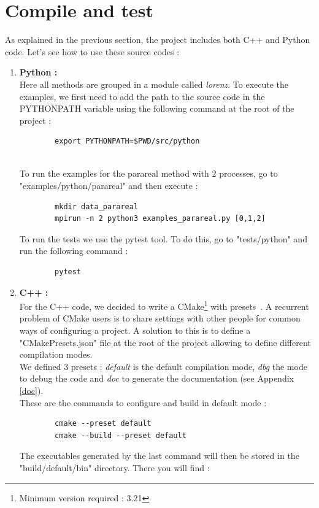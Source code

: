 \newpage

\section{Compile and test}
\label{compile}

	As explained in the previous section, the project includes both C++ and Python code. Let's see how to use these source codes :
	\begin{enumerate}[label=\textbullet]
		\item \textbf{Python :} \\
		Here all methods are grouped in a module called \textit{lorenz}. To execute the examples, we first need to add the path to the source code in the PYTHONPATH variable using the following command at the root of the project :
\begin{lstlisting}
		export PYTHONPATH=$PWD/src/python
\end{lstlisting}
		 \\
		To run the examples for the parareal method with 2 processes, go to "examples/python/parareal" and then execute :
\begin{lstlisting}
		mkdir data_parareal
		mpirun -n 2 python3 examples_parareal.py [0,1,2]
\end{lstlisting}
		To run the tests we use the pytest tool. To do this, go to "tests/python" and run the following command :
\begin{lstlisting}
		pytest
\end{lstlisting}
		\item \textbf{C++ :} \\
		For the C++ code, we decided to write a CMake\footnote[1]{Minimum version required : 3.21} with presets~\cite{cmake_preset}.  A recurrent problem of CMake users is to share settings with other people for common ways of configuring a project. A solution to this is to define a "CMakePresets.json" file at the root of the project allowing to define different compilation modes. \\
		We defined 3 presets : \textit{default} is the default compilation mode, \textit{dbg} the mode to debug the code and \textit{doc} to generate the documentation (see Appendix \ref{doc}). \\
		These are the commands to configure and build in default mode :
\begin{lstlisting}
		cmake --preset default
		cmake --build --preset default
\end{lstlisting}
		The executables generated by the last command will then be stored in the "build/default/bin" directory. There you will find :

\end{enumerate}
